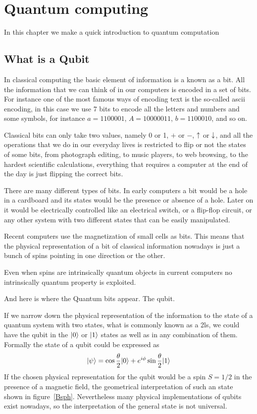 \chapter{Quantum computing}
In this chapter we make a quick introduction to quantum computation 
\section{What is a Qubit}
In classical computing the basic element of information is a known as a bit. All the information that we can think of in our computers is encoded in a set of bits.
For instance one of the most famous ways of encoding text is the so-called \ac{ascii} encoding, in this case we use 7 bits to encode all the letters and numbers and some symbols, for instance $a=1100001$, $A=10000011$, $b=1100010$, and so on.

Classical bits can only take two values, namely 0 or 1, $+$ or $-$, $\uparrow$ or $\downarrow$, and all the operations that we do in our everyday lives is restricted to flip or not the states of some bits, from photograph editing, to music players, to web browsing, to the hardest scientific calculations, everything that requires a computer at the end of the day is just flipping the correct bits.


There are many different types of bits. In early computers a bit would be a hole in a cardboard and its states would be the presence or absence of a hole. Later on it would be electrically controlled like an electrical switch, or a flip-flop circuit, or any other system with two different states that can be easily manipulated.

Recent computers use the magnetization of small cells as bits. This means that the physical representation of a bit of classical information nowadays is just a bunch of spins pointing in one direction or the other.

Even when spins are intrinsically quantum objects in current computers no intrinsically quantum property is exploited.


And here is where the Quantum bits appear. The qubit.


If we narrow down the physical representation of the information to the state of a quantum system with two states, what is commonly known as a \ac{2ls}, we could have the qubit in the $|0\rangle$ or $|1\rangle$ states as well as in any combination of them. Formally the state of a qubit could be expressed as
\begin{equation}
  |\psi\rangle = \cos\frac{\theta}{2}|0\rangle +e^{i\phi}\sin\frac{\theta}{2}|1\rangle
\label{genstate}
\end{equation}
If the chosen physical representation for the qubit would be a spin $S=1/2$ in the presence of a magnetic field, the geometrical interpretation of such an state shown in figure~\ref{Bsph}. Nevertheless many physical implementations of qubits exist nowadays, so the interpretation of the general state is not universal.


